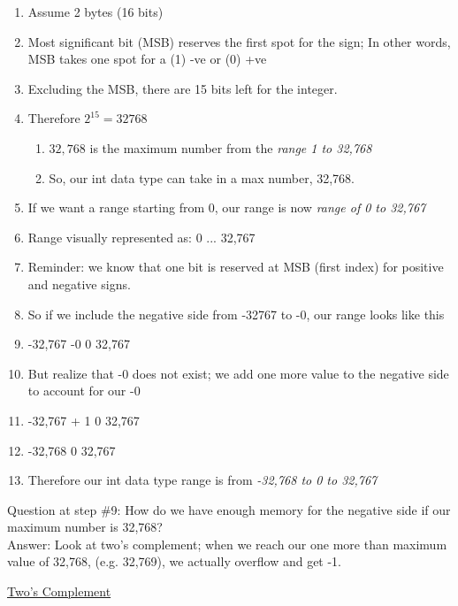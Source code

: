 \documentclass[a4paper,12pt]{book}
\begin{document}
\begin{enumerate}
	\item Assume 2 bytes (16 bits)
	\item Most significant bit (MSB) reserves the first spot for the sign; In other words, MSB takes one spot for a (1) -ve or (0) +ve
	\item Excluding the MSB, there are 15 bits left for the integer.
	\item Therefore $2^{15} = 32768$	
		\begin{enumerate}
			\item $32,768$ is the maximum number from the \textit{range 1 to 32,768}
			\item So, our int data type can take in a max number, 32,768.
		\end{enumerate}
	\item If we want a range starting from 0, our range is now \textit{range of 0 to 32,767}
	\item   Range visually represented as:  0     \hspace{1cm}  ...     32,767
	\item Reminder: we know that one bit is reserved at MSB (first index) for positive and negative signs. 
	\item  So if we include the negative side from -32767 to -0, our range looks like this
	\item -32,767  \hspace{1cm}        -0 \hspace {1cm} 0 \hspace {1cm} 32,767
	
	\item But realize that -0 does not exist; we add one more value to the negative side to account for our -0
	\item -32,767 + 1  \hspace {1cm} 0 \hspace {1cm} 32,767	
	\item -32,768  \hspace {1cm} 0 \hspace {1cm} 32,767
	\item Therefore our int data type range is from \textit{-32,768 to 0 to 32,767}
\end{enumerate}	

Question at step \#9: How do we have enough memory for the negative side if our maximum number is 32,768? \\
Answer: Look at two's complement; when we reach our one more than maximum value of 32,768, (e.g. 32,769), we actually overflow and get -1. 

\href{https://www.cs.cornell.edu/~tomf/notes/cps104/twoscomp.html}{Two's Complement} \\
\end{document}
